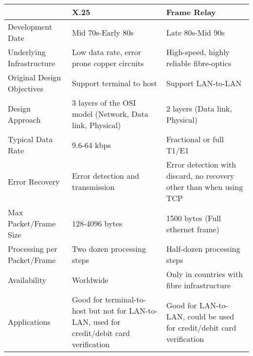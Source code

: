 \begin{center}
\begin{tabular}{ |p{}|p{}|p{}| }
  \hline
  & X.25 & Frame Relay \\
  \hline
  Development Date & Mid 70s-Early 80s & Late 80s-Mid 90s \\
  Underlying Infrastructure & Low data rate, error prone copper circuits & High-speed, highly reliable fibre-optics \\
  Original Design Objectives & Support terminal to host & Support LAN-to-LAN \\
  Design Approach & 3 layers of the OSI model (Network, Data link, Physical) & 2 layers (Data link, Physical) \\
  Typical Data Rate & 9.6-64 kbps & Fractional or full T1/E1 \\
  Error Recovery & Error detection and transmission & Error detection with discard, no recovery other than when using TCP \\
  Max Packet/Frame Size & 128-4096 bytes & 1500 bytes (Full ethernet frame) \\
  Processing per Packet/Frame & Two dozen processing steps & Half-dozen processing steps \\
  Availability & Worldwide & Only in countries with fibre infrastructure \\
  Applications & Good for terminal-to-host but not for LAN-to-LAN, used for credit/debit card verification & Good for LAN-to-LAN, could be used for credit/debit card verification \\
  \hline
\end{tabular}
\end{center}
